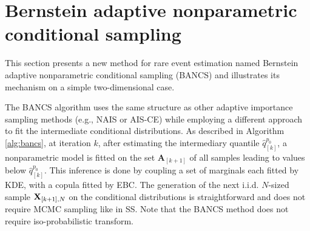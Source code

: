 \section{Bernstein adaptive nonparametric conditional sampling}\label{sec:bancs}
This section presents a new method for rare event estimation named Bernstein adaptive nonparametric conditional sampling (BANCS) and illustrates its mechanism on a simple two-dimensional case. 


The BANCS algorithm uses the same structure as other adaptive importance sampling methods (e.g., NAIS or AIS-CE) while employing a different approach to fit the intermediate conditional distributions. 
As described in Algorithm \ref{alg:bancs}, at iteration $k$, after estimating the intermediary quantile $\widehat{q}_{[k]}^{p_0}$, a nonparametric model is fitted on the set $\mathbf{A}_{[k+1]}$ of all samples leading to values below $\widehat{q}_{[k]}^{p_0}$.  
This inference is done by coupling a set of marginals each fitted by KDE, with a copula fitted by EBC. 
The generation of the next i.i.d. $N$-sized sample ${\bf X}_{[k+1], N}$ on the conditional distributions is straightforward and does not require MCMC sampling like in SS. 
Note that the BANCS method does not require iso-probabilistic transform.

